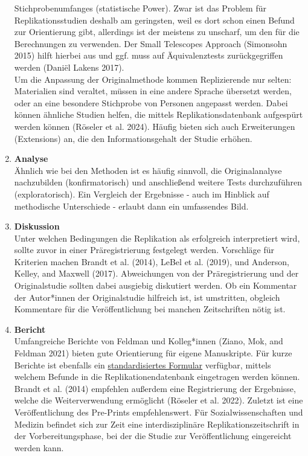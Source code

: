 \documentclass[
  letterpaper,
  DIV=11,
  numbers=noendperiod]{scrreprt}
\begin{document}
\begin{tcolorbox}
\begin{enumerate}
  Stichprobenumfanges (statistische Power). Zwar ist das Problem für
  Replikationsstudien deshalb am geringsten, weil es dort schon einen
  Befund zur Orientierung gibt, allerdings ist der meistens zu unscharf,
  um den für die Berechnungen zu verwenden. Der Small Telescopes
  Approach (Simonsohn 2015) hilft hierbei aus und ggf. muss auf
  Äquivalenztests zurückgegriffen werden (Daniël Lakens 2017).\\
  Um die Anpassung der Originalmethode kommen Replizierende nur selten:
  Materialien sind veraltet, müssen in eine andere Sprache übersetzt
  werden, oder an eine besondere Stichprobe von Personen angepasst
  werden. Dabei können ähnliche Studien helfen, die mittels
  Replikationsdatenbank aufgespürt werden können (Röseler et al. 2024).
  Häufig bieten sich auch Erweiterungen (Extensions) an, die den
  Informationsgehalt der Studie erhöhen.
\item
  \textbf{Analyse}\\
  Ähnlich wie bei den Methoden ist es häufig sinnvoll, die
  Originalanalyse nachzubilden (konfirmatorisch) und anschließend
  weitere Tests durchzuführen (exploratorisch). Ein Vergleich der
  Ergebnisse - auch im Hinblick auf methodische Unterschiede - erlaubt
  dann ein umfassendes Bild.
\item
  \textbf{Diskussion}\\
  Unter welchen Bedingungen die Replikation als erfolgreich
  interpretiert wird, sollte zuvor in einer Präregistrierung festgelegt
  werden. Vorschläge für Kriterien machen Brandt et al. (2014), LeBel et
  al. (2019), und Anderson, Kelley, and Maxwell (2017). Abweichungen von
  der Präregistrierung und der Originalstudie sollten dabei ausgiebig
  diskutiert werden. Ob ein Kommentar der Autor*innen der Originalstudie
  hilfreich ist, ist umstritten, obgleich Kommentare für die
  Veröffentlichung bei manchen Zeitschriften nötig ist.
\item
  \textbf{Bericht}\\
  Umfangreiche Berichte von Feldman und Kolleg*innen (Ziano, Mok, and
  Feldman 2021) bieten gute Orientierung für eigene Manuskripte. Für
  kurze Berichte ist ebenfalls ein
  \href{https://osf.io/j2qrx}{standardisiertes Formular} verfügbar,
  mittels welchem Befunde in die Replikationendatenbank eingetragen
  werden können. Brandt et al. (2014) empfehlen außerdem eine
  Registrierung der Ergebnisse, welche die Weiterverwendung ermöglicht
  (Röseler et al. 2022). Zuletzt ist eine Veröffentlichung des
  Pre-Prints empfehlenswert. Für Sozialwissenschaften und Medizin
  befindet sich zur Zeit eine interdisziplinäre Replikationszeitschrift
  in der Vorbereitungsphase, bei der die Studie zur Veröffentlichung
  eingereicht werden kann.
\end{enumerate}

\end{tcolorbox}
\end{document}
